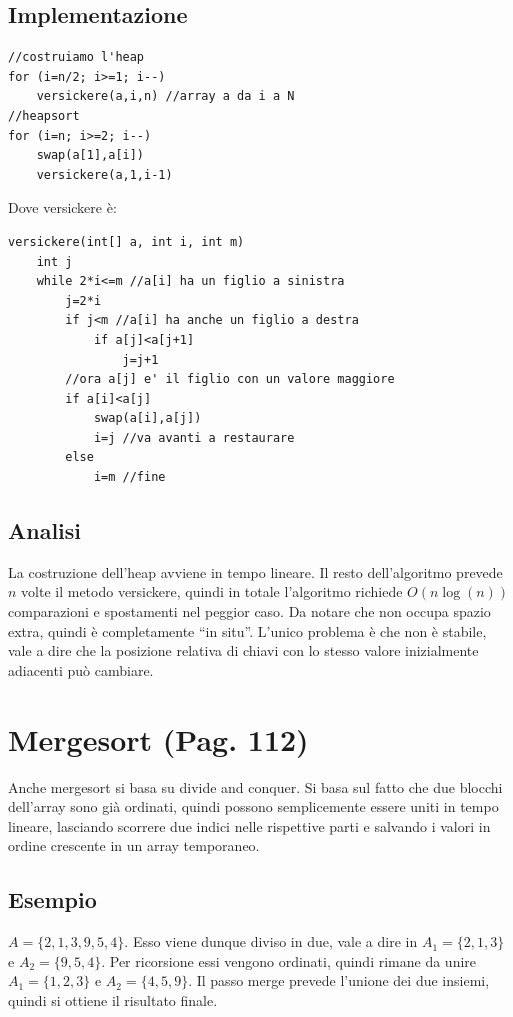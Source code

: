 \documentclass[a4paper]{book}
\newcommand{\lstIndent}{4}
\begin{document}
\subsection*{Implementazione}
\begin{lstlisting}[tabsize=\lstIndent]
//costruiamo l'heap
for (i=n/2; i>=1; i--)
	versickere(a,i,n) //array a da i a N
//heapsort	
for (i=n; i>=2; i--)
	swap(a[1],a[i])
	versickere(a,1,i-1)
\end{lstlisting}                                                                          
Dove versickere è:
\begin{lstlisting}[tabsize=\lstIndent]
versickere(int[] a, int i, int m)
	int j
	while 2*i<=m //a[i] ha un figlio a sinistra
		j=2*i
		if j<m //a[i] ha anche un figlio a destra
			if a[j]<a[j+1]
				j=j+1
		//ora a[j] e' il figlio con un valore maggiore
		if a[i]<a[j]
			swap(a[i],a[j])
			i=j //va avanti a restaurare
		else
			i=m //fine		
\end{lstlisting}                                                                                                 
\subsection*{Analisi}
La costruzione dell'heap avviene in tempo lineare. Il resto dell'algoritmo prevede $n$ volte il metodo versickere, quindi in totale l'algoritmo richiede $O(n \log (n))$ comparazioni e spostamenti nel peggior caso. Da notare che non occupa spazio extra, quindi è completamente ``in situ''. L'unico problema è che non è stabile, vale a dire che la posizione relativa di chiavi con lo stesso valore inizialmente adiacenti può cambiare. 

\section{Mergesort (Pag. 112)}
Anche mergesort si basa su divide and conquer. Si basa sul fatto che due blocchi dell'array sono già ordinati, quindi possono semplicemente essere uniti in tempo lineare, lasciando scorrere due indici nelle rispettive parti e salvando i valori in ordine crescente in un array temporaneo.

\subsection*{Esempio}
$A=\{2, 1, 3, 9, 5, 4\}$. Esso viene dunque diviso in due, vale a dire in $A_1 =\{2,1,3\}$ e $A_2 =\{9,5,4\}$. Per ricorsione essi vengono ordinati, quindi rimane da unire $A_1 =\{1,2,3\}$ e $A_2 =\{4,5,9\}$. Il passo merge prevede l'unione dei due insiemi, quindi si ottiene il risultato finale.
\end{document}
